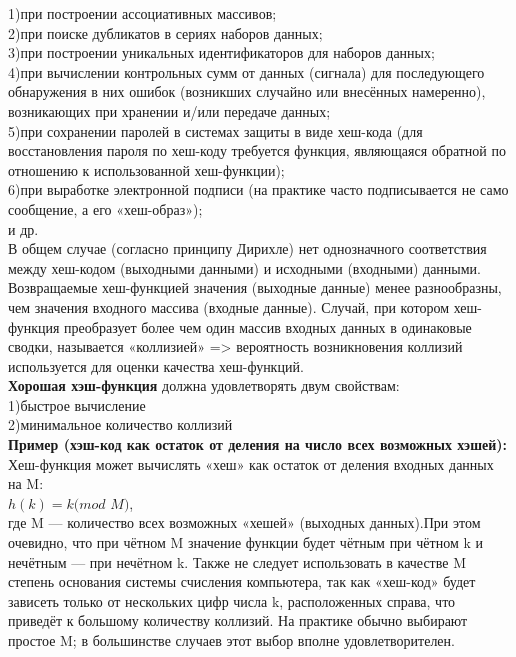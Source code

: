 \documentclass[a4paper,12pt]{article}
\begin{document}
1)при построении ассоциативных массивов;\\

2)при поиске дубликатов в сериях наборов данных;\\

3)при построении уникальных идентификаторов для наборов данных;\\

4)при вычислении контрольных сумм от данных (сигнала) для последующего обнаружения в них ошибок (возникших случайно или внесённых намеренно), возникающих при хранении и/или передаче данных;\\

5)при сохранении паролей в системах защиты в виде хеш-кода (для восстановления пароля по хеш-коду требуется функция, являющаяся обратной по отношению к использованной хеш-функции);\\

6)при выработке электронной подписи (на практике часто подписывается не само сообщение, а его «хеш-образ»);\\

и др.\\

В общем случае (согласно принципу Дирихле) нет однозначного соответствия между хеш-кодом (выходными данными) и исходными (входными) данными. Возвращаемые хеш-функцией значения (выходные данные) менее разнообразны, чем значения входного массива (входные данные). Случай, при котором хеш-функция преобразует более чем один массив входных данных в одинаковые сводки, называется «коллизией» => вероятность возникновения коллизий используется для оценки качества хеш-функций.\\

\textbf{Хорошая хэш-функция} должна удовлетворять двум свойствам:\\
1)быстрое вычисление\\
2)минимальное количество коллизий\\

\textbf{Пример (хэш-код как остаток от деления на число всех возможных хэшей):}\\

Хеш-функция может вычислять «хеш» как остаток от деления входных данных на M:\\
$ h(k)=k(mod$ $M)$,\\
где M — количество всех возможных «хешей» (выходных данных).При этом очевидно, что при чётном M значение функции будет чётным при чётном k и нечётным — при нечётном k. Также не следует использовать в качестве M степень основания системы счисления компьютера, так как «хеш-код» будет зависеть только от нескольких цифр числа k, расположенных справа, что приведёт к большому количеству коллизий. На практике обычно выбирают простое M; в большинстве случаев этот выбор вполне удовлетворителен.\\
\end{document}
